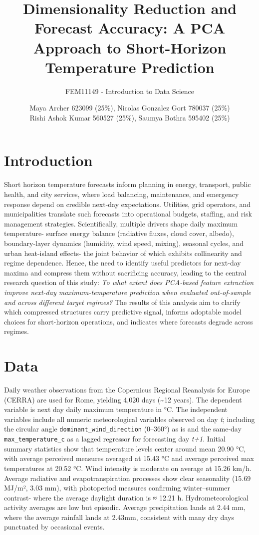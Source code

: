 \documentclass[
]{article}
\title{Dimensionality Reduction and Forecast Accuracy: A PCA Approach to
Short-Horizon Temperature Prediction}
\subtitle{FEM11149 - Introduction to Data Science}
\author{Maya Archer 623099 (25\%), Nicolas Gonzalez Gort 780037 (25\%)\\
Rishi Ashok Kumar 560527 (25\%), Saumya Bothra 595402 (25\%)}
\date{}
\begin{document}
\maketitle

\section{Introduction}\label{introduction}

Short horizon temperature forecasts inform planning in energy,
transport, public health, and city services, where load balancing,
maintenance, and emergency response depend on credible next-day
expectations. Utilities, grid operators, and municipalities translate
such forecasts into operational budgets, staffing, and risk management
strategies. Scientifically, multiple drivers shape daily maximum
temperature- surface energy balance (radiative fluxes, cloud cover,
albedo), boundary-layer dynamics (humidity, wind speed, mixing),
seasonal cycles, and urban heat-island effects- the joint behavior of
which exhibits collinearity and regime dependence. Hence, the need to
identify useful predictors for next-day maxima and compress them without
sacrificing accuracy, leading to the central research question of this
study: \emph{To what extent does PCA-based feature extraction improve
next-day maximum-temperature prediction when evaluated out-of-sample and
across different target regimes?} The results of this analysis aim to
clarify which compressed structures carry predictive signal, informs
adoptable model choices for short-horizon operations, and indicates
where forecasts degrade across regimes.

\section{Data}\label{data}

Daily weather observations from the Copernicus Regional Reanalysis for
Europe (CERRA) are used for Rome, yielding 4,020 days (\textasciitilde12
years). The dependent variable is next day daily maximum temperature in
°C. The independent variables include all numeric meteorological
variables observed on day \emph{t}; including the circular angle
\texttt{dominant\_wind\_direction} (0--360°) as is and the same-day
\texttt{max\_temperature\_c} as a lagged regressor for forecasting day
\emph{t+1}. Initial summary statistics show that temperature levels
center around mean 20.90 °C, with average perceived measures averaged at
15.43 °C and average perceived max temperatures at 20.52 °C. Wind
intensity is moderate on average at 15.26 km/h. Average radiative and
evapotranspiration processes show clear seasonality (15.69 MJ/m², 3.03
mm), with photoperiod measures confirming winter--summer contrast- where
the average daylight duration is ≈ 12.21 h. Hydrometeorological activity
averages are low but episodic. Average precipitation lands at 2.44 mm,
where the average rainfall lands at 2.43mm, consistent with many dry
days punctuated by occasional events.
\end{document}
